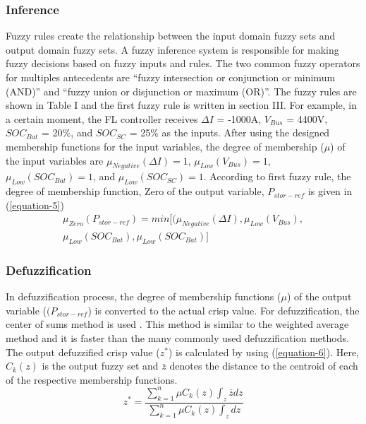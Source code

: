 \subsubsection{Inference}Fuzzy rules create the relationship between the input domain fuzzy sets and output domain fuzzy sets. A fuzzy inference system is responsible for making fuzzy decisions based on fuzzy inputs and rules. The two common fuzzy operators for multiples antecedents are “fuzzy intersection or conjunction or minimum (AND)” and “fuzzy union or disjunction or maximum (OR)”. The fuzzy rules are shown in Table I and the first fuzzy rule is written in section III. For example, in a certain moment, the FL controller receives $\Delta I$ = -1000A, $V_{Bus}$ = 4400V, $SOC_{Bat}$ = 20\%, and $SOC_{SC}$ = 25\% as the inputs. After using the designed membership functions for the input variables, the degree of membership ($\mu$) of the input variables are  $\mu_{Negative}(\Delta I) = 1$, $\mu_{Low}(V_{Bus}) = 1$,  $\mu_{Low}(SOC_{Bat}) = 1$, and  $\mu_{Low}(SOC_{SC}) = 1$. According to first fuzzy rule, the degree of membership function, Zero of the output variable, $P_{stor-ref}$ is given in (\ref{equation-5})
\begin{multline}\label{equation-5}
\mu_{Zero}(P_{stor-ref})= min[(\mu_{Negative}(\Delta I), \mu_{Low}(V_{Bus}), \\
\mu_{Low}(SOC_{Bat}), \mu_{Low}(SOC_{Bat})]
\end{multline}
\subsubsection{Defuzzification} In defuzzification process, the degree of membership functions ($\mu$) of the output variable ($(P_{stor-ref}$) is converted to the actual crisp value. For defuzzification, the center of sums method is used \cite{ross2009fuzzy}. This method is similar to the weighted average method and it is faster than the many commonly used defuzzification methods. The output defuzzified crisp value ($z^{\ast}$) is calculated by using (\ref{equation-6}).  Here, $C_k(z)$ is the output fuzzy set and  $\bar{z}$ denotes the distance to the centroid of each of the respective membership functions. 
\begin{equation}\label{equation-6}
z^{\ast}=\frac{\sum_{k=1}^{n}\mu C_k(z)\int_z \bar{z} dz}{\sum_{k=1}^{n}\mu C_k(z)\int_z dz}
\end{equation}
